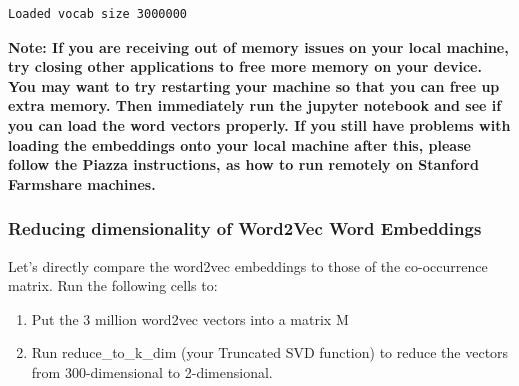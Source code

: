 \documentclass[11pt]{article}
\providecommand{\tightlist}{%
      \setlength{\itemsep}{0pt}\setlength{\parskip}{0pt}}
\begin{document}
    \begin{Verbatim}[commandchars=\\\{\}]
Loaded vocab size 3000000

    \end{Verbatim}

    \textbf{Note: If you are receiving out of memory issues on your local
machine, try closing other applications to free more memory on your
device. You may want to try restarting your machine so that you can free
up extra memory. Then immediately run the jupyter notebook and see if
you can load the word vectors properly. If you still have problems with
loading the embeddings onto your local machine after this, please follow
the Piazza instructions, as how to run remotely on Stanford Farmshare
machines.}

    \subsubsection{Reducing dimensionality of Word2Vec Word
Embeddings}\label{reducing-dimensionality-of-word2vec-word-embeddings}

Let's directly compare the word2vec embeddings to those of the
co-occurrence matrix. Run the following cells to:

\begin{enumerate}
\def\labelenumi{\arabic{enumi}.}
\tightlist
\item
  Put the 3 million word2vec vectors into a matrix M
\item
  Run reduce\_to\_k\_dim (your Truncated SVD function) to reduce the
  vectors from 300-dimensional to 2-dimensional.
\end{enumerate}
\end{document}
